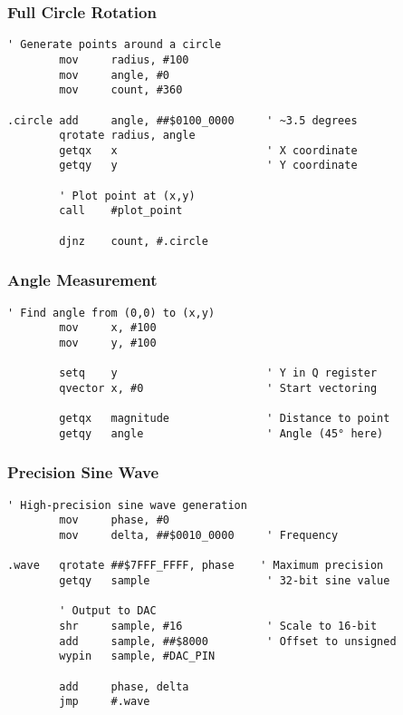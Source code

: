 \documentclass[11pt]{book}
\begin{document}
\hypertarget{full-circle-rotation}{%
\subsubsection{Full Circle Rotation}\label{full-circle-rotation}}

\begin{lstlisting}
' Generate points around a circle
        mov     radius, #100
        mov     angle, #0
        mov     count, #360
        
.circle add     angle, ##$0100_0000     ' ~3.5 degrees
        qrotate radius, angle
        getqx   x                       ' X coordinate
        getqy   y                       ' Y coordinate
        
        ' Plot point at (x,y)
        call    #plot_point
        
        djnz    count, #.circle
\end{lstlisting}

\hypertarget{angle-measurement}{%
\subsubsection{Angle Measurement}\label{angle-measurement}}

\begin{lstlisting}
' Find angle from (0,0) to (x,y)
        mov     x, #100
        mov     y, #100
        
        setq    y                       ' Y in Q register
        qvector x, #0                   ' Start vectoring
        
        getqx   magnitude               ' Distance to point
        getqy   angle                   ' Angle (45° here)
\end{lstlisting}

\hypertarget{precision-sine-wave}{%
\subsubsection{Precision Sine Wave}\label{precision-sine-wave}}

\begin{lstlisting}
' High-precision sine wave generation
        mov     phase, #0
        mov     delta, ##$0010_0000     ' Frequency
        
.wave   qrotate ##$7FFF_FFFF, phase    ' Maximum precision
        getqy   sample                  ' 32-bit sine value
        
        ' Output to DAC
        shr     sample, #16             ' Scale to 16-bit
        add     sample, ##$8000         ' Offset to unsigned
        wypin   sample, #DAC_PIN
        
        add     phase, delta
        jmp     #.wave
\end{lstlisting}
\end{document}
